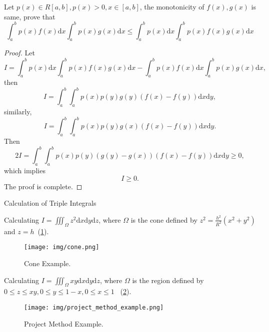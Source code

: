 \documentclass[11pt]{../../TexTemplate/elegantbook}
\begin{document}
\begin{example}
    Let \(p(x)\in R[a,b],p(x)>0,x\in [a,b]\), the monotonicity of \(f(x), g(x)\) is same,
    prove that
    \[
    \int_{a}^{b}p(x)f(x)\mathrm{d}x \int_{a}^{b}p(x)g(x)\mathrm{d}x
    \leqslant  \int_{a}^{b}p(x)\mathrm{d}x \int_{a}^{b}p(x)f(x)g(x)\mathrm{d}x
    \]
\end{example}
\begin{proof}
    Let
    \[
    I = \int_{a}^{b}p(x)\mathrm{d}x \int_{a}^{b}p(x)f(x)g(x)\mathrm{d}x
        - \int_{a}^{b}p(x)f(x)\mathrm{d}x \int_{a}^{b}p(x)g(x)\mathrm{d}x,
    \]
    then
    \[
    I = \int_{a}^{b}\int_{a}^{b}p(x)p(y)g(y)(f(x)-f(y))\mathrm{d}x\mathrm{d}y,
    \]
    similarly,
    \[
    I = \int_{a}^{b}\int_{a}^{b}p(x)p(y)g(x)(f(x)-f(y))\mathrm{d}x\mathrm{d}y.
    \]
    Then 
    \[
    2I = \int_{a}^{b}\int_{a}^{b}p(x)p(y)(g(y)-g(x))(f(x)-f(y))\mathrm{d}x\mathrm{d}y \geqslant  0,
    \]
    which implies
    \[
    I \geqslant  0.
    \]
    The proof is complete.
\end{proof}

\begin{leftbarTitle}{Calculation of Triple Integrals}\end{leftbarTitle}
\begin{example}\label{eg:Triple Integral of Cone}
    Calculating \(I = \iiint_{ \Omega }z^{2}\mathrm{d}x\mathrm{d}y\mathrm{d}z\),
    where \(\Omega\) is the cone defined by \(z^{2} = \frac{h^{2}}{R^{2}}(x^{2}+y^{2})\) 
    and \(z = h\)~(\ref{fig:Cone}).
    \begin{figure}[h]
        \centering
        \texttt{[image: img/cone.png]}
        \caption{Cone Example.}
        \label{fig:Cone}
    \end{figure}
\end{example}

\begin{example}\label{eg:Project Method Example}
    Calculating \(I = \iiint_{ \Omega }xy\mathrm{d}x\mathrm{d}y\mathrm{d}z\),
    where \(\Omega\) is the region defined 
    by \(0 \leqslant z \leqslant xy, 0\leqslant y \leqslant 1-x, 0\leqslant x \leqslant 1\)
    ~(\ref{fig:Project Method Example}).
    \begin{figure}[h]
        \centering
        \texttt{[image: img/project\_method\_example.png]}
        \caption{Project Method Example.}
        \label{fig:Project Method Example}
    \end{figure}
\end{example}
\end{document}
